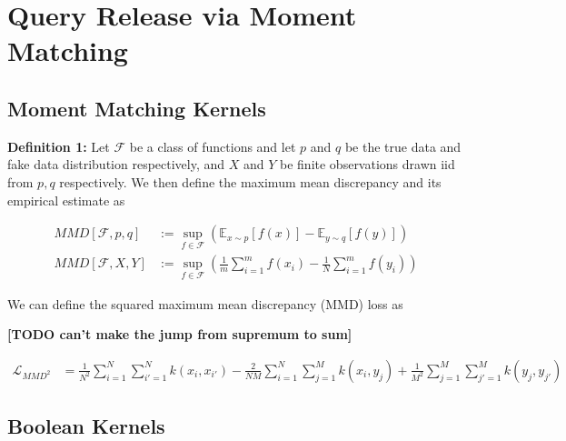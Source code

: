 \documentclass[
]{article}
\date{}
\begin{document}
\hypertarget{header-n23}{%
\section{Query Release via Moment Matching}\label{header-n23}}

\hypertarget{header-n26}{%
\subsection{Moment Matching Kernels}\label{header-n26}}

\textbf{Definition 1:} Let \(\mathcal{F}\) be a class of functions and
let \(p\) and \(q\) be the true data and fake data distribution
respectively, and \(X\) and \(Y\) be finite observations drawn iid from
\(p,q\) respectively. We then define the maximum mean discrepancy and
its empirical estimate as

\begin{align}
  MMD[\mathcal{F},p,q] &:= \sup_{f\in\mathcal{F}}\left( \mathbb{E}_{x\sim p}[f(x)] - \mathbb{E}_{y\sim q}[f(y)]\right)\\
  MMD[\mathcal{F},X,Y] &:= \sup_{f\in\mathcal{F}}\left( \frac{1}{m} \sum_{i=1}^m f(x_i) -  \frac{1}N \sum_{i=1}^m f(y_i) \right)
\end{align}

We can define the squared maximum mean discrepancy (MMD) loss as

\textbf{[TODO can't make the jump from supremum to sum]}


\textbf{}
\begin{align*} 
  \mathcal{L}_{MMD^2} &=\frac{1}{N^2} \sum_{i=1}^N \sum_{i'=1}^N k \left(x_i, x_{i'}\right) - \frac{2}{N M} \sum_{i=1}^N \sum_{j=1}^M k\left(x_i, y_j\right) +\frac{1}{M^2} \sum_{j=1}^M \sum_{j'=1}^M k\left(y_j, y_{j'}\right) \end{align*}

\hypertarget{header-n35}{%
\subsection{Boolean Kernels}\label{header-n35}}
\end{document}
